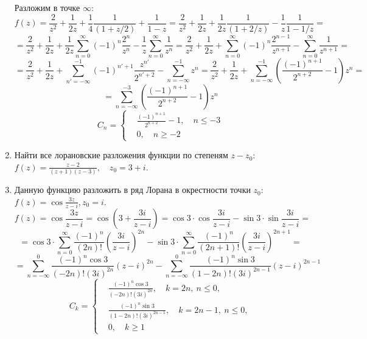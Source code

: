 \documentclass[14pt, a4paper, titlepage, fleqn]{extarticle}
\begin{document}
\begin{enumerate}
        Разложим в точке \( \infty \):
        \[
            f(z) = \frac{2}{z^2} + \frac{1}{2 z} + \frac{1}{4} \frac{1}{(1 + z/2)} + \frac{1}{1 - z} =
            \frac{2}{z^2} + \frac{1}{2 z} + \frac{1}{2z} \frac{1}{(1 + 2/z)} - \frac{1}{z} \frac{1}{1 - 1/z} =
        \]
        \[
            = \frac{2}{z^2} + \frac{1}{2 z} + \frac{1}{2z} \sum_{n=0}^\infty (-1)^n \frac{2^n}{z^n} - \frac{1}{z} \sum_{n=0}^\infty \frac{1}{z^n} 
            = \frac{2}{z^2} + \frac{1}{2 z} + \sum_{n=0}^\infty (-1)^n \frac{2^{n-1}}{z^{n+1}} - \sum_{n=0}^\infty \frac{1}{z^{n+1}} =
        \]
        \[
            = \frac{2}{z^2} + \frac{1}{2 z} + \sum_{n'=-\infty}^{-1} (-1)^{n'+1} \frac{z^{n'} }{2^{n'+2}} - \sum_{n=-\infty}^{-1} z^n
            = \frac{2}{z^2} + \frac{1}{2 z} + \sum_{n=-\infty}^{-1} \left( \frac{(-1)^{n+1}}{2^{n+2}} - 1 \right) z^n =
        \]
        \[
            = \sum_{n=-\infty}^{-3} \left( \frac{(-1)^{n+1}}{2^{n+2}} - 1 \right) z^n
        \]
        \[
            C_n = \left\lbrace
                \begin{aligned}
                    &\frac{(-1)^{n+1}}{2^{n+2}} - 1, \quad n \leq -3 \\
                    &0, \quad n \geq -2
                \end{aligned}
            \right.
        \]

        \item Найти все лорановские разложения функции по степеням \( z - z_0 \): \( \displaystyle f(z) = \frac{z-2}{(z+1)(z-3)}, \quad z_0 = 3+i \).  
        
        \pagebreak

        \item Данную функцию разложить в ряд Лорана в окрестности точки \( z_0 \): \( \displaystyle f(z) = \cos \frac{3z}{z-i}, z_0 = i \).
        \[
            f(z) = \cos \frac{3z}{z-i} = \cos \left( 3 + \frac{3i}{z-i} \right) = \cos 3 \cdot \cos \frac{3i}{z-i} - \sin 3 \cdot \sin \frac{3i}{z-i} =
        \]
        \[
            = \cos 3 \cdot \sum_{n=0}^{\infty} \frac{(-1)^n}{(2n)!} \left( \frac{3i}{z-i} \right)^{2n}  - \sin 3 \cdot \sum_{n=0}^{\infty} \frac{(-1)^n}{(2n+1)!} \left( \frac{3i}{z-i} \right)^{2n+1} =
        \]
        \[
            = \sum_{n=-\infty}^{0} \frac{(-1)^n \cos 3}{(-2n)! (3i)^{2n}} \left( z-i \right)^{2n}  - \sum_{n=-\infty}^{0} \frac{(-1)^n \sin 3}{(1-2n)! (3i)^{2n-1}} \left( z-i \right)^{2n-1}
        \]
        \[
            C_k = \left\lbrace
                \begin{aligned}
                    &\frac{(-1)^n \cos 3}{(-2n)! (3i)^{2n}}, \quad k = 2n, ~ n \leq 0, \\
                    &\frac{(-1)^n \sin 3}{(1-2n)! (3i)^{2n-1}}, \quad k = 2n-1, ~ n \leq 0, \\
                    &0, \quad k \geq 1
                \end{aligned}
            \right.
        \]  


\end{enumerate}
\end{document}
